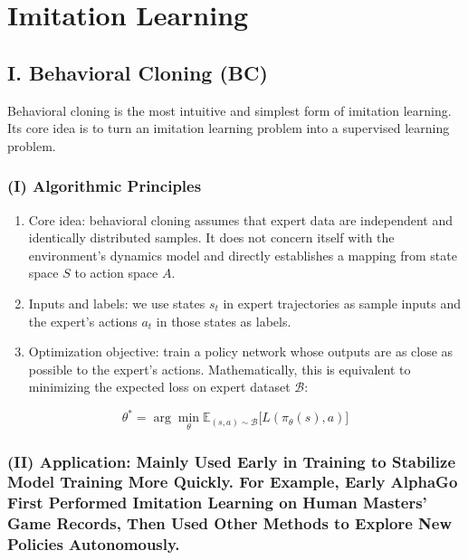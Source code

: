 \setcounter{section}{0}

\hypertarget{imitation-learning}{%
\section{Imitation Learning}\label{imitation-learning}}

\hypertarget{i.-behavioral-cloning-bc}{%
\subsection{I. Behavioral Cloning (BC)}\label{i.-behavioral-cloning-bc}}

Behavioral cloning is the most intuitive and simplest form of imitation learning. Its core idea is to turn an imitation learning problem into a supervised learning problem.

\hypertarget{i-algorithmic-principles}{%
\subsubsection{(I) Algorithmic Principles}\label{i-algorithmic-principles}}

\begin{enumerate}
\def\labelenumi{\arabic{enumi}.}
\item
  Core idea: behavioral cloning assumes that expert data are independent and identically distributed samples. It does not concern itself with the environment's dynamics model and directly establishes a mapping from state space \(S\) to action space \(A\).
\item
  Inputs and labels: we use states \(s_t\) in expert trajectories as sample inputs and the expert's actions \(a_t\) in those states as labels.
\item
{}
  Optimization objective: train a policy network whose outputs are as close as possible to the expert's actions. Mathematically, this is equivalent to minimizing the expected loss on expert dataset \(\mathcal{B}\):
\end{enumerate}

\[
\theta^{*}
=
\arg\min_\theta
\mathbb{E}_{(s,a)\sim\mathcal{B}}
\bigl[
L(\pi_\theta(s),a)
\bigr]
\]

\hypertarget{ii-application-mainly-used-early-in-training-to-stabilize-model-training-more-quickly.-for-example-early-alphago-first-performed-imitation-learning-on-human-masters-game-records-then-used-other-methods-to-explore-new-policies-autonomously.}{%
\subsubsection{(II) Application: Mainly Used Early in Training to Stabilize Model Training More Quickly. For Example, Early AlphaGo First Performed Imitation Learning on Human Masters' Game Records, Then Used Other Methods to Explore New Policies Autonomously.}\label{ii-application-mainly-used-early-in-training-to-stabilize-model-training-more-quickly.-for-example-early-alphago-first-performed-imitation-learning-on-human-masters-game-records-then-used-other-methods-to-explore-new-policies-autonomously.}}

